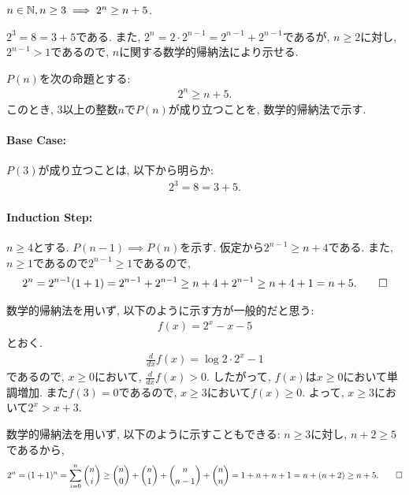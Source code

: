 \begin{prop}
  \label{p:20230810}
  $n\in\mathbb{N}, n\geq 3 \implies 2^n\geq n+5$.
\end{prop}
\begin{proof**}
  $2^3=8=3+5$である.
  また,
  $2^n=2\cdot 2^{n-1}=2^{n-1}+2^{n-1}$であるが,
  $n\geq 2$に対し,
  $2^{n-1} > 1$であるので,
  $n$に関する数学的帰納法により示せる.
\end{proof**}
\begin{proof*}
  $P(n)$を次の命題とする:
  \begin{align*}
    2^n\geq n+5
    .
  \end{align*}
  このとき,
  $3$以上の整数$n$で$P(n)$が成り立つことを,
  数学的帰納法で示す.

  \paragraph{Base Case:}
  $P(3)$が成り立つことは, 以下から明らか:
  \begin{align*}
    2^3=8=3+5.
  \end{align*}
  \paragraph{Induction Step:}
  $n\geq 4$とする.
  $P(n-1)\implies P(n)$を示す.
  仮定から$2^{n-1}\geq n+4$である.
  また, $n\geq 1$であるので$2^{n-1}\geq 1$であるので,
  \begin{align*}
    2^n=2^{n-1}(1+1)=2^{n-1}+2^{n-1}\geq n+4+2^{n-1}\geq n+4+1=n+5
    .\qedhere
  \end{align*}
\end{proof*}

\begin{rem}
  数学的帰納法を用いず, 以下のように示す方が一般的だと思う:
  \begin{align*}
    f(x)=2^x-x-5
  \end{align*}
  とおく.
  \begin{align*}
    \frac{d}{dx}f(x)=\log 2 \cdot 2^x-1
  \end{align*}
  であるので, $x\geq 0$において, $\frac{d}{dx}f(x)> 0$.
  したがって, $f(x)$は$x\geq 0$において単調増加.
  また$f(3)=0$であるので,
  $x\geq 3$において$f(x)\geq 0$.
  よって, $x\geq 3$において$2^x>x+3$.
\end{rem}

\begin{rem}
  数学的帰納法を用いず, 以下のように示すこともできる:
  $n\geq 3$に対し, $n+2\geq 5$であるから,
  \begin{align*}
    2^n=(1+1)^n=\sum_{i=0}^n \binom{n}{i}\geq \binom{n}{0}+\binom{n}{1}+\binom{n}{n-1}+\binom{n}{n}=1+n+n+1=n+(n+2)\geq n+5
    .\qedhere
  \end{align*}
\end{rem}

